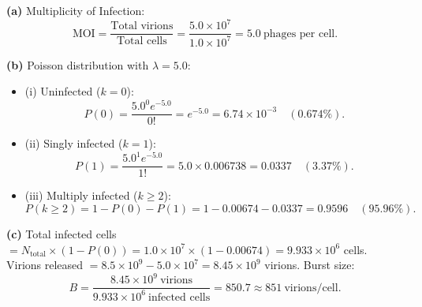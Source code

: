 \documentclass[12pt, a4paper, oneside]{report}
\begin{document}

\begin{solution}
  \textbf{(a)} Multiplicity of Infection:
  \[
    \text{MOI} = \frac{\text{Total virions}}{\text{Total cells}} = \frac{5.0 \times 10^7}{1.0 \times 10^7} = 5.0~\text{phages per cell}.
  \]

  \textbf{(b)} Poisson distribution with $\lambda = 5.0$:
  \begin{itemize}
    \item (i) Uninfected ($k=0$):
          \[
            P(0) = \frac{5.0^0 e^{-5.0}}{0!} = e^{-5.0} = 6.74 \times 10^{-3} \quad (0.674\%).
          \]
    \item (ii) Singly infected ($k=1$):
          \[
            P(1) = \frac{5.0^1 e^{-5.0}}{1!} = 5.0 \times 0.006738 = 0.0337 \quad (3.37\%).
          \]
    \item (iii) Multiply infected ($k \ge 2$):
          \[
            P(k \ge 2) = 1 - P(0) - P(1) = 1 - 0.00674 - 0.0337 = 0.9596 \quad (95.96\%).
          \]
  \end{itemize}

  \textbf{(c)} Total infected cells $= N_{\text{total}} \times (1 - P(0)) = 1.0 \times 10^7 \times (1 - 0.00674) = 9.933 \times 10^6$ cells.
  Virions released $= 8.5 \times 10^9 - 5.0 \times 10^7 = 8.45 \times 10^9$ virions.
  Burst size:
  \[
    B = \frac{8.45 \times 10^9~\text{virions}}{9.933 \times 10^6~\text{infected cells}} = 850.7 \approx 851~\text{virions/cell}.
  \]
\end{solution}
\end{document}
